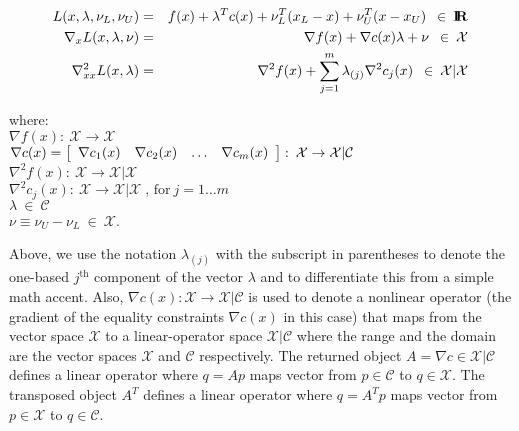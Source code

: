 \documentclass[pdf,ps2pdf,11pt]{SANDreport}
\begin{document}
{{\bsinglespace
\begin{eqnarray}
L(x,\lambda,\nu_L,\nu_U)
& = & f(x) + \lambda^T c(x) + \nu_L^T ( x_L - x ) + \nu_U^T ( x - x_U ) \; \:\in\:\RE
\label{moocho:eqn:L_def} \\
\nabla_{x} L(x,\lambda,\nu)
& = & \nabla f(x) + \nabla c(x) \lambda + \nu \; \:\in\:\mathcal{X}
\label{moocho:eqn:GL_def} \\
\nabla_{xx}^2 L(x,\lambda)
& = & \nabla^2 f(x) + \sum^m_{j=1} \lambda_{(j)} \nabla^2 c_j(x) \; \:\in\: \mathcal{X}|\mathcal{X}
\label{moocho:eqn:HL_def}
\end{eqnarray}
%
\begin{tabbing}
\hspace{4ex}where:\hspace{5ex}\= \\
\>	$\nabla f(x) : \:\mathcal{X} \rightarrow \mathcal{X}$ \\
\>	$\nabla c(x) = {\bmat{cccc} \nabla c_1 (x) & \nabla c_2 (x) & \ldots & \nabla c_m (x)  \emat}
         : \:\mathcal{X} \rightarrow \mathcal{X}|\mathcal{C}$ \\
\>	$\nabla^2 f(x) : \:\mathcal{X} \rightarrow \mathcal{X}|\mathcal{X}$ \\
\>	$\nabla^2 c_j(x) : \:\mathcal{X} \rightarrow \mathcal{X}|\mathcal{X} \; \mbox{, for}\:j = 1 \ldots m$ \\
\>	$\lambda \:\in\:\mathcal{C}$ \\
\>	$\nu \equiv \nu_U - \nu_L \:\in\:\mathcal{X}$.
\end{tabbing}

Above, we use the notation $\lambda_{(j)}$ with the subscript in parentheses
to denote the one-based $j^{\mbox{th}}$ component of the vector $\lambda$ and
to differentiate this from a simple math accent.  Also, $\nabla c(x) :
{}\mathcal{X} {}\rightarrow {}\mathcal{X}|\mathcal{C}$ is used to denote a
nonlinear operator (the gradient of the equality constraints $\nabla c(x)$ in
this case) that maps from the vector space $\mathcal{X}$ to a linear-operator
space $\mathcal{X}|\mathcal{C}$ where the range and the domain are the vector
spaces $\mathcal{X}$ and $\mathcal{C}$ respectively.  The returned object $A =
{}\nabla c {}\in\mathcal{X}|\mathcal{C}$ defines a linear operator where $q =
A p$ maps vector from $p \in\mathcal{C}$ to $q {}\in\mathcal{X}$.  The
transposed object $A^T$ defines a linear operator where $q = A^T p$ maps
vector from $p {}\in\mathcal{X}$ to $q {}\in\mathcal{C}$.

}}
\end{document}
